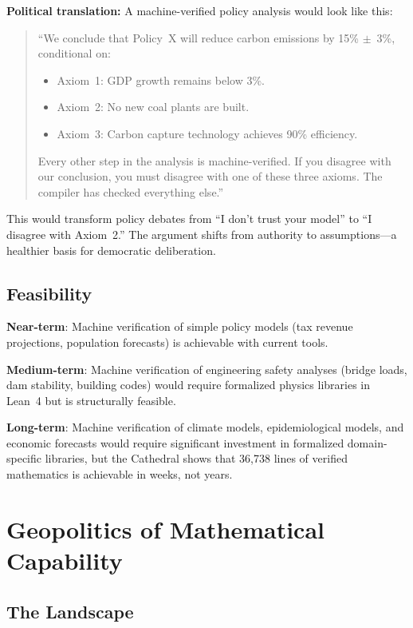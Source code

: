 \documentclass[11pt,a4paper]{article}
\begin{document}
\textbf{Political translation:} A machine-verified policy analysis
would look like this:

\begin{quote}
``We conclude that Policy~X will reduce carbon emissions by 15\%
$\pm$~3\%, conditional on:
\begin{itemize}
  \item Axiom~1: GDP growth remains below 3\%.
  \item Axiom~2: No new coal plants are built.
  \item Axiom~3: Carbon capture technology achieves 90\% efficiency.
\end{itemize}
Every other step in the analysis is machine-verified. If you
disagree with our conclusion, you must disagree with one of these
three axioms. The compiler has checked everything else.''
\end{quote}

This would transform policy debates from ``I don't trust your model''
to ``I disagree with Axiom~2.'' The argument shifts from authority
to assumptions---a healthier basis for democratic deliberation.

\subsection{Feasibility}

\textbf{Near-term}: Machine verification of simple policy models
(tax revenue projections, population forecasts) is achievable with
current tools.

\textbf{Medium-term}: Machine verification of engineering safety
analyses (bridge loads, dam stability, building codes) would require
formalized physics libraries in Lean~4 but is structurally feasible.

\textbf{Long-term}: Machine verification of climate models,
epidemiological models, and economic forecasts would require
significant investment in formalized domain-specific libraries, but
the Cathedral shows that 36,738 lines of verified mathematics
is achievable in weeks, not years.

\section{Geopolitics of Mathematical Capability}
\label{sec:geopolitics}

\subsection{The Landscape}
\end{document}
